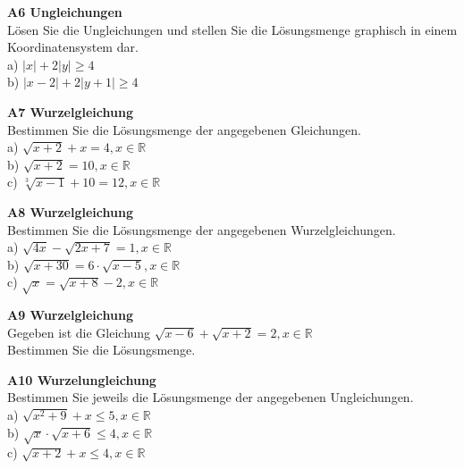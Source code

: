 \documentclass[landscape,twocolumn,a4paper]{article}
\begin{document}
 \newpage
 
 \textbf{A6 Ungleichungen} \\
 Lösen Sie die Ungleichungen und stellen Sie die Lösungsmenge graphisch in einem Koordinatensystem dar. \\
 a) $\vert x \vert + 2 \vert y \vert \ge 4$ \\
 b) $\vert x - 2 \vert + 2\vert y + 1 \vert \ge 4$
 \bigskip
 
 \textbf{A7 Wurzelgleichung}  \\
 Bestimmen Sie die Lösungsmenge der angegebenen Gleichungen. \\
 a) $\sqrt{x+2} + x = 4,  x \in \mathbb{R}$ \\
 b) $\sqrt{x+2} = 10,  x \in \mathbb{R}$ \\
 c) $\sqrt[3]{x-1} + 10 = 12,  x \in \mathbb{R}$ 
 \bigskip
 
  \textbf{A8 Wurzelgleichung} \\
 Bestimmen Sie die Lösungsmenge der angegebenen Wurzelgleichungen. \\
 a) $\sqrt{4x} -\sqrt{2x+7}=1,  x \in \mathbb{R}$ \\
 b) $\sqrt{x+30} = 6 \cdot \sqrt{x-5},  x \in \mathbb{R}$ \\
 c) $\sqrt{x} = \sqrt{x+8} - 2,  x \in \mathbb{R}$ 
 \bigskip
 
\textbf{A9 Wurzelgleichung} \\
Gegeben ist die Gleichung $\sqrt{x-6} + \sqrt{x+2} = 2, x \in \mathbb{R}$ \\
Bestimmen Sie die Lösungsmenge.
\bigskip

\textbf{A10 Wurzelungleichung} \\
Bestimmen Sie jeweils die Lösungsmenge der angegebenen Ungleichungen. \\
a) $\sqrt{x^2+9} + x \le 5,  x \in \mathbb{R}$ \\
b) $\sqrt{x} \cdot \sqrt{x+6} \le 4,  x \in \mathbb{R}$ \\
c) $\sqrt{x+2} + x \le 4,  x \in \mathbb{R}$ 
\bigskip
\end{document}
